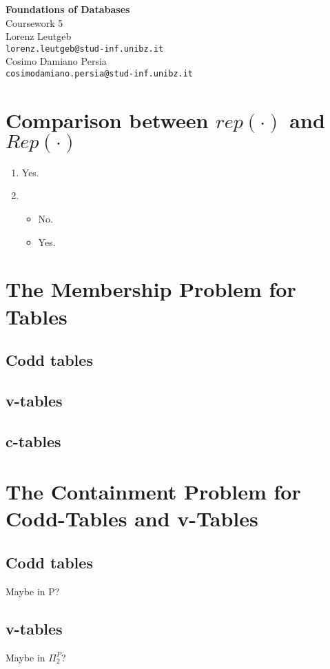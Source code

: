 \documentclass[a4paper,12pt]{article}
\begin{document}
\begin{center}
{\LARGE\bfseries Foundations of Databases}\\[3mm]

{\Large Coursework 5}\\[5mm]

Lorenz Leutgeb\\\texttt{lorenz.leutgeb@stud-inf.unibz.it}\\[2mm]
Cosimo Damiano Persia\\\texttt{cosimodamiano.persia@stud-inf.unibz.it}
\end{center}

\section{Comparison between $rep(\cdot)$ and $Rep(\cdot)$}

\begin{enumerate}
\item{Yes. %
}
\item{
\begin{itemize}
\item{No. %
}
\item{Yes.  %
}
\end{itemize}
}
\end{enumerate}

\section{The Membership Problem for Tables}


\subsection{Codd tables}

\subsection{v-tables}

\subsection{c-tables}

\section{The Containment Problem for Codd-Tables and v-Tables}


\subsection{Codd tables}

Maybe in P? %

\subsection{v-tables}

Maybe in $\Pi^P_2$? %
\end{document}
